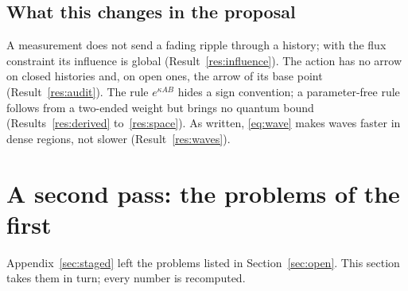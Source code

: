 \documentclass[11pt]{article}
\theoremstyle{definition}
\begin{document}
\subsection{What this changes in the proposal}\label{sec:staged-changes}
A measurement does not send a fading ripple through a history; with the flux constraint its influence is global (Result~\ref{res:influence}). The action has no arrow on closed histories and, on open ones, the arrow of its base point (Result~\ref{res:audit}). The rule $e^{\kappa AB}$ hides a sign convention; a parameter-free rule follows from a two-ended weight but brings no quantum bound (Results~\ref{res:derived} to~\ref{res:space}). As written, \eqref{eq:wave} makes waves faster in dense regions, not slower (Result~\ref{res:waves}).


\section{A second pass: the problems of the first}\label{sec:second}
Appendix~\ref{sec:staged} left the problems listed in Section~\ref{sec:open}. This section takes them in turn; every number is recomputed.
\end{document}
